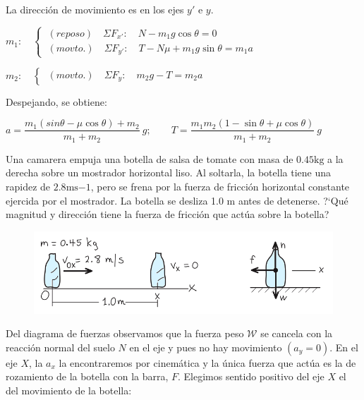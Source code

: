 La dirección de movimiento es en los ejes $y'$ e $y$.

$m_1:\quad \begin{cases} \ (reposo) \quad  \Sigma F_{x'}: \quad N-m_1g\cos \theta =0 \\ \ (movto.) \quad \Sigma F_{y'}: \quad T-N\mu+m_1g\sin \theta=m_1 a \end{cases}$

$m_2: \quad \begin{cases} \ (movto.) \quad \Sigma F_y: \quad m_2g-T=m_2 a \end{cases} $

Despejando, se obtiene:

$a=\dfrac{m_1(sin \theta - \mu \cos \theta)+m_2}{m_1+m_2}\ g; \qquad  T=\dfrac {m_1m_2(1-\sin \theta+\mu \cos \theta)}{m_1+m_2}\ g$

\vspace{15mm} %
\begin{prob}
Una camarera empuja una botella de salsa de tomate con masa de $0.45 \mathrm{kg}$ a la derecha sobre un mostrador horizontal liso. Al soltarla, la botella tiene una rapidez de $2.8 \mathrm{ms}{-1}$, pero se frena por la fuerza de fricción horizontal constante ejercida por el mostrador. La botella se desliza 1.0 m antes de detenerse. ?`Qué magnitud y dirección tiene la fuerza de fricción que actúa sobre la botella?
\end{prob}

\vspace{8mm} %
\begin{figure}[H]
	\centering
	\includegraphics[width=.75\textwidth]{imagenes/imagenes03/T03IM37.png}
	\end{figure}
	
\vspace{-4mm} Del diagrama de fuerzas observamos que la fuerza peso $\mathcal W$ se cancela con la reacción normal del suelo $N$ en el eje y pues no hay movimiento $(a_y=0)$. En el eje $X$, la $a_x$ la encontraremos por cinemática y la única fuerza que actúa es la de rozamiento de la botella con la barra, $F$. Elegimos sentido positivo del eje $X$ el del movimiento de la botella:

